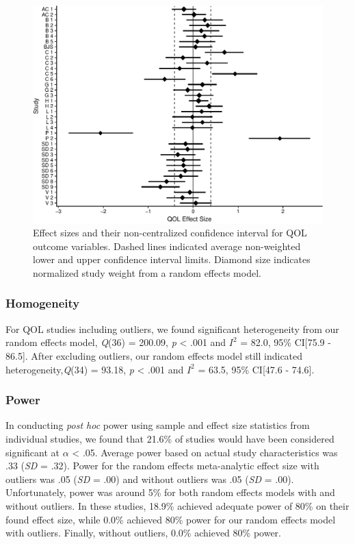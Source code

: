 \documentclass[man, mask]{apa6}
\theoremstyle{definition}
\theoremstyle{definition}
\theoremstyle{definition}
\theoremstyle{remark}
\begin{document}
\begin{figure}[htbp]
\centering
\includegraphics{meta_markdown_files/figure-latex/qolpic-1.pdf}
\caption{\label{fig:qolpic}Effect sizes and their non-centralized confidence
interval for QOL outcome variables. Dashed lines indicated average
non-weighted lower and upper confidence interval limits. Diamond size
indicates normalized study weight from a random effects model.}
\end{figure}

\subsubsection{Homogeneity}\label{homogeneity-2}

For QOL studies including outliers, we found significant heterogeneity
from our random effects model, \emph{Q}(36) = 200.09, \emph{p}
\textless{} .001 and \(I^2\) = 82.0, 95\% CI{[}75.9 - 86.5{]}. After
excluding outliers, our random effects model still indicated
heterogeneity,\emph{Q}(34) = 93.18, \emph{p} \textless{} .001 and
\(I^2\) = 63.5, 95\% CI{[}47.6 - 74.6{]}.

\subsubsection{Power}\label{power-2}

In conducting \emph{post hoc} power using sample and effect size
statistics from individual studies, we found that 21.6\% of studies
would have been considered significant at \(\alpha\) \textless{} .05.
Average power based on actual study characteristics was .33 (\emph{SD} =
.32). Power for the random effects meta-analytic effect size with
outliers was .05 (\emph{SD} = .00) and without outliers was .05
(\emph{SD} = .00). Unfortunately, power was around 5\% for both random
effects models with and without outliers. In these studies, 18.9\%
achieved adequate power of 80\% on their found effect size, while 0.0\%
achieved 80\% power for our random effects model with outliers. Finally,
without outliers, 0.0\% achieved 80\% power.
\end{document}
